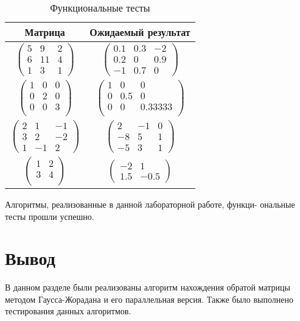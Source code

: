 \begin{table}[h!]
	\begin{center}
        \caption{\label{tab:tests}Функциональные тесты}
        \begin{tabular}{|c|c|}
			\hline
            \textbf{Матрица} & \textbf{Ожидаемый
            результат}\\ [2mm]
            \hline
			$\begin{pmatrix}
                5 & 9 & 2\\
                6 & 11 & 4\\
                1 & 3 & 1
			\end{pmatrix}$ &
			$\begin{pmatrix}
                0.1 & 0.3 & -2\\
                0.2 & 0 & 0.9\\
                -1 & 0.7 & 0
			\end{pmatrix}$\\
            \hline
            $\begin{pmatrix}
                1 & 0 & 0 \\
                0 & 2 & 0 \\
                0 & 0 & 3 \\
			\end{pmatrix}$ &
			$\begin{pmatrix}
                1 & 0 & 0 \\
                0 & 0.5 & 0 \\
                0 & 0& 0.33333 \\
			\end{pmatrix}$\\
            \hline
			$\begin{pmatrix}
                2 & 1 & -1 \\
                3 & 2 & -2 \\
                1 & -1 & 2
			\end{pmatrix}$ &
			$\begin{pmatrix}
                2 & -1 & 0 \\
                -8 & 5 & 1 \\
                -5 & 3 & 1
			\end{pmatrix}$\\
            \hline
			$\begin{pmatrix}
                1 & 2\\
                3 & 4\\
			\end{pmatrix}$ &
            $\begin{pmatrix}
                -2 & 1\\
                1.5 & -0.5
			\end{pmatrix}$\\
            \hline
		\end{tabular}
	\end{center}
\end{table}

Алгоритмы, реализованные в данной лабораторной работе, функци-
ональные тесты прошли успешно.

\section*{Вывод}

В данном разделе были реализованы алгоритм нахождения обратой 
матрицы методом Гаусса-Жорадана и его параллельная версия.
Также было выполнено тестирования данных алгоритмов.